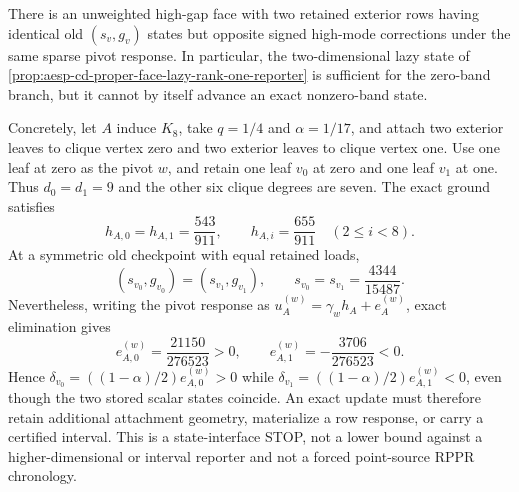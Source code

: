 \begin{proposition}
\label{prop:aesp-cd-high-gap-two-state-gray-stop}
There is an unweighted high-gap face with two retained exterior rows having
identical old \((s_v,g_v)\) states but opposite signed high-mode corrections
under the same sparse pivot response.  In particular, the two-dimensional
lazy state of
\cref{prop:aesp-cd-proper-face-lazy-rank-one-reporter} is sufficient for the
zero-band branch, but it cannot by itself advance an exact nonzero-band
state.

Concretely, let \(A\) induce \(K_8\), take
\(q=1/4\) and \(\alpha=1/17\), and attach two exterior leaves to clique
vertex zero and two exterior leaves to clique vertex one.  Use one leaf at
zero as the pivot \(w\), and retain one leaf \(v_0\) at zero and one leaf
\(v_1\) at one.  Thus \(d_0=d_1=9\) and the other six clique degrees are
seven.  The exact ground satisfies
\begin{equation*}
 h_{A,0}=h_{A,1}=\frac{543}{911},
 \qquad
 h_{A,i}=\frac{655}{911}\quad(2\leq i<8).
\end{equation*}
At a symmetric old checkpoint with equal retained loads,
\begin{equation}
 (s_{v_0},g_{v_0})=(s_{v_1},g_{v_1}),
 \qquad
 s_{v_0}=s_{v_1}=\frac{4344}{15487}.
 \label{eq:aesp-cd-high-gap-identical-two-state}
\end{equation}
Nevertheless, writing the pivot response as
\(u_A^{(w)}=\gamma_wh_A+e_A^{(w)}\), exact elimination gives
\begin{equation}
 e_{A,0}^{(w)}=\frac{21150}{276523}>0,
 \qquad
 e_{A,1}^{(w)}=-\frac{3706}{276523}<0.
 \label{eq:aesp-cd-high-gap-opposite-two-state-errors}
\end{equation}
Hence
\(\delta_{v_0}=((1-\alpha)/2)e_{A,0}^{(w)}>0\) while
\(\delta_{v_1}=((1-\alpha)/2)e_{A,1}^{(w)}<0\), even though the two stored
scalar states coincide.  An exact update must therefore retain additional
attachment geometry, materialize a row response, or carry a certified
interval.  This is a state-interface STOP, not a lower bound against a
higher-dimensional or interval reporter and not a forced point-source RPPR
chronology.
\end{proposition}


